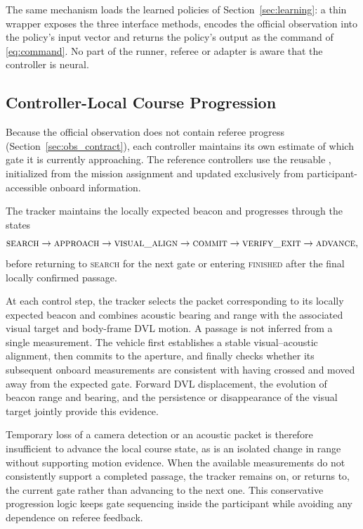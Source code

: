 The same mechanism loads the learned policies of Section~\ref{sec:learning}: a
thin wrapper exposes the three interface methods, encodes the official
observation into the policy's input vector and returns the policy's output as the
command of \eqref{eq:command}. No part of the runner, referee or adapter is aware
that the controller is neural.

\subsection{Controller-Local Course Progression}

Because the official observation does not contain referee progress
(Section~\ref{sec:obs_contract}), each controller maintains its own estimate of
which gate it is currently approaching. The reference controllers use the
reusable , initialized from the mission assignment and
updated exclusively from participant-accessible onboard information.

The tracker maintains the locally expected beacon and progresses through the
states
\begin{equation*}
\textsc{search}\rightarrow\textsc{approach}\rightarrow\textsc{visual\_align}
\rightarrow\textsc{commit}\rightarrow\textsc{verify\_exit}\rightarrow\textsc{advance},
\end{equation*}
before returning to \textsc{search} for the next gate or entering
\textsc{finished} after the final locally confirmed passage.

At each control step, the tracker selects the packet corresponding to its
locally expected beacon and combines acoustic bearing and range with the
associated visual target and body-frame DVL motion. A passage is not inferred
from a single measurement. The vehicle first establishes a stable
visual--acoustic alignment, then commits to the aperture, and finally checks
whether its subsequent onboard measurements are consistent with having crossed
and moved away from the expected gate. Forward DVL displacement, the evolution
of beacon range and bearing, and the persistence or disappearance of the visual
target jointly provide this evidence.

Temporary loss of a camera detection or an acoustic packet is therefore
insufficient to advance the local course state, as is an isolated change in
range without supporting motion evidence. When the available measurements do
not consistently support a completed passage, the tracker remains on, or
returns to, the current gate rather than advancing to the next one. This
conservative progression logic keeps gate sequencing inside the participant
while avoiding any dependence on referee feedback.


